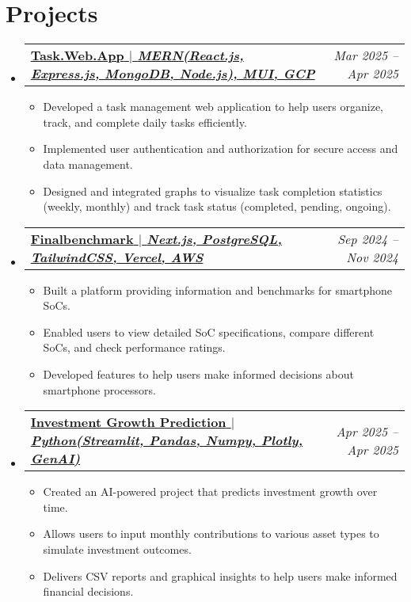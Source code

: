 \documentclass[letterpaper,11pt]{article}
\makeatletter
\newcommand{\resumeItem}[1]{
  \item\small{ %
    {#1 \vspace{-2pt}}
  }
}
\newcommand{\resumeProjectHeading}[2]{
    \item
    \begin{tabular*}{0.97\textwidth}{l@{\extracolsep{\fill}}r}
      \textbf{#1} & \textit{\small #2} \\ %
    \end{tabular*}\vspace{-7pt}
}
\newcommand{\resumeSubHeadingListStart}{\begin{itemize}[leftmargin=0.15in, label={}]}
\newcommand{\resumeSubHeadingListEnd}{\end{itemize}}
\newcommand{\resumeItemListStart}{\begin{itemize}}
\newcommand{\resumeItemListEnd}{\end{itemize}\vspace{-5pt}}
\makeatother
\begin{document}
\section{Projects}
\resumeSubHeadingListStart
\resumeProjectHeading{%
  \href{https://github.com/abhay-byte/task_management_tool}{%
    {\small\textbf{Task.Web.App} $|$ \emph{MERN(React.js, Express.js, MongoDB, Node.js), MUI, GCP}}%
  }%
}{Mar 2025 -- Apr 2025}
      \resumeItemListStart
        \resumeItem{Developed a task management web application to help users organize, track, and complete daily tasks efficiently.} %
        \resumeItem{Implemented user authentication and authorization for secure access and data management.} %
        \resumeItem{Designed and integrated graphs to visualize task completion statistics (weekly, monthly) and track task status (completed, pending, ongoing).} %
      \resumeItemListEnd
\resumeProjectHeading{%
  \href{https://github.com/abhay-byte/fb_nextjs}{%
    {\small\textbf{Finalbenchmark} $|$ \emph{Next.js, PostgreSQL, TailwindCSS, Vercel, AWS}}%
  }%
}{Sep 2024 -- Nov 2024} %
      \resumeItemListStart
        \resumeItem{Built a platform providing information and benchmarks for smartphone SoCs.} %
        \resumeItem{Enabled users to view detailed SoC specifications, compare different SoCs, and check performance ratings.} %
        \resumeItem{Developed features to help users make informed decisions about smartphone processors.} %
      \resumeItemListEnd
\resumeProjectHeading{%
  \href{https://aiwrapper.streamlit.app/}{%
    {\small\textbf{Investment Growth Prediction} $|$ \emph{Python(Streamlit, Pandas, Numpy, Plotly, GenAI)}}%
  }%
}{Apr 2025 -- Apr 2025} %
      \resumeItemListStart
        \resumeItem{Created an AI-powered project that predicts investment growth over time.} %
        \resumeItem{Allows users to input monthly contributions to various asset types to simulate investment outcomes.} %
        \resumeItem{Delivers CSV reports and graphical insights to help users make informed financial decisions.} %
      \resumeItemListEnd
\resumeSubHeadingListEnd

\end{document}
